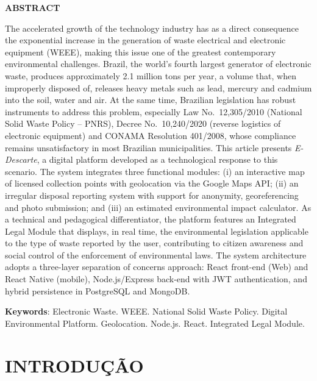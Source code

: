 \documentclass[12pt, a4paper]{article}
\numberwithin{equation}{section}
\numberwithin{figure}{section}
\numberwithin{table}{section}
\begin{document}
\begin{center}
  {\normalsize\bfseries ABSTRACT}
\end{center}
\noindent
The accelerated growth of the technology industry has as a direct consequence
the exponential increase in the generation of waste electrical and electronic
equipment (WEEE), making this issue one of the greatest contemporary
environmental challenges. Brazil, the world's fourth largest generator of
electronic waste, produces approximately 2.1 million tons per year, a volume
that, when improperly disposed of, releases heavy metals such as lead, mercury
and cadmium into the soil, water and air. At the same time, Brazilian legislation
has robust instruments to address this problem, especially Law No.\ 12,305/2010
(National Solid Waste Policy -- PNRS), Decree No.\ 10,240/2020 (reverse
logistics of electronic equipment) and CONAMA Resolution 401/2008, whose
compliance remains unsatisfactory in most Brazilian municipalities. This article
presents \textit{E-Descarte}, a digital platform developed as a technological
response to this scenario. The system integrates three functional modules: (i) an
interactive map of licensed collection points with geolocation via the Google
Maps API; (ii) an irregular disposal reporting system with support for anonymity,
georeferencing and photo submission; and (iii) an estimated environmental impact
calculator. As a technical and pedagogical differentiator, the platform features
an Integrated Legal Module that displays, in real time, the environmental
legislation applicable to the type of waste reported by the user, contributing
to citizen awareness and social control of the enforcement of environmental laws.
The system architecture adopts a three-layer separation of concerns approach:
React front-end (Web) and React Native (mobile), Node.js/Express back-end with
JWT authentication, and hybrid persistence in PostgreSQL and MongoDB.

\vspace{0.5cm}
\noindent
\textbf{Keywords}: Electronic Waste. WEEE. National Solid Waste Policy.
Digital Environmental Platform. Geolocation. Node.js. React.
Integrated Legal Module.

\clearpage

\tableofcontents
\clearpage

\section{INTRODUÇÃO}
\end{document}
